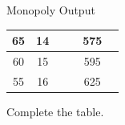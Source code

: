\documentclass{beamer}
\begin{document}
\begin{frame}[t]{Monopoly Output}
\begin{table}[H]
\begin{tabular}{cccccc}
    65         & 14                                                           &                                                          &                                                             & 575                                                                &                                                         \\ \hline
    60         & 15                                                           &                                                          &                                                             & 595                                                                &                                                         \\ \hline
    55         & 16                                                           &                                                          &                                                             & 625                                                                &                                                        
    \end{tabular}
    \end{table}
    Complete the table.
\end{frame}
\end{document}
